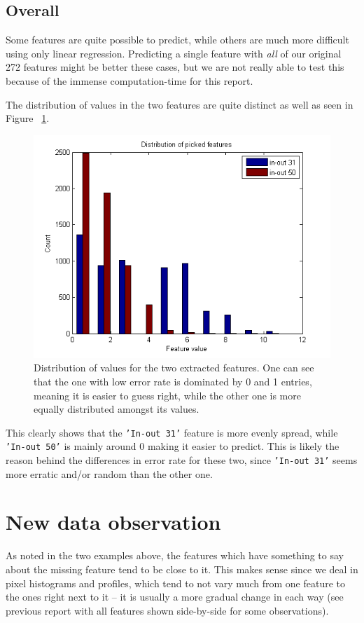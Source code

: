 \subsection*{Overall}
Some features are quite possible to predict, while others are much more difficult using only linear regression. Predicting a single feature with \emph{all} of our original 272 features might be better these cases, but we are not really able to test this because of the immense computation-time for this report.

The distribution of values in the two features are quite distinct as well as seen in Figure ~\ref{fig:attr_hist}.

\begin{figure}[H]
\centering
\includegraphics[width=0.6\linewidth]{code/attribute_histograms}
\caption{Distribution of values for the two extracted features. One can see that the one with low error rate is dominated by 0 and 1 entries, meaning it is easier to guess right, while the other one is more equally distributed amongst its values.}
\label{fig:attr_hist}
\end{figure}

This clearly shows that the \texttt{'In-out 31'} feature is more evenly spread, while \texttt{'In-out 50'} is mainly around 0 making it easier to predict. This is likely the reason behind the differences in error rate for these two, since \texttt{'In-out 31'} seems more erratic and/or random than the other one.

\section{New data observation}
As noted in the two examples above, the features which have something to say about the missing feature tend to be close to it. This makes sense since we deal in pixel histograms and profiles, which tend to not vary much from one feature to the ones right next to it -- it is usually a more gradual change in each way (see previous report with all features shown side-by-side for some observations).


